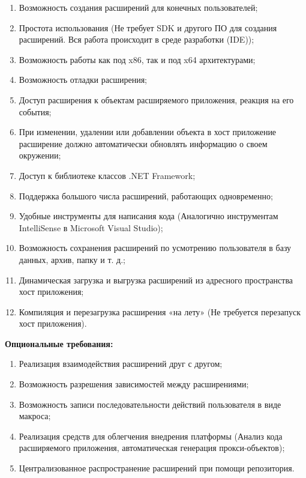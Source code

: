\label{sec:requirements}
\begin{enumerate}
	\item Возможность создания расширений для конечных пользователей;
	\item Простота использования (Не требует SDK и другого ПО для создания расширений. Вся работа происходит в среде разработки (IDE));
	\item Возможность работы как под x86, так и под x64 архитектурами;
	\item Возможность отладки расширения;
	\item Доступ расширения к объектам расширяемого приложения, реакция на его события;
	\item При изменении, удалении или добавлении объекта в хост приложение расширение должно автоматически обновлять информацию о своем окружении;
	\item Доступ к библиотеке классов .NET Framework;
	\item Поддержка большого числа расширений, работающих одновременно;
	\item Удобные инструменты для написания кода (Аналогично инструментам IntelliSense в Microsoft Visual Studio);
	\item Возможность сохранения расширений по усмотрению пользователя в базу данных, архив, папку и т. д.;
	\item Динамическая загрузка и выгрузка расширений из адресного пространства хост приложения;
	\item Компиляция и перезагрузка расширения «на лету» (Не требуется перезапуск хост приложения).
\end{enumerate}

{\bf Опциональные требования:}
\label{sec:opt_requirements}
\begin{enumerate}
	\item Реализация взаимодействия расширений друг с другом;
	\item Возможность разрешения зависимостей между расширениями;
	\item Возможность записи последовательности действий пользователя в виде макроса;
	\item Реализация средств для облегчения внедрения платформы (Анализ кода расширяемого приложения, автоматическая генерация прокси-объектов);
	\item Централизованное распространение расширений при помощи репозитория.
\end{enumerate}

\pagebreak